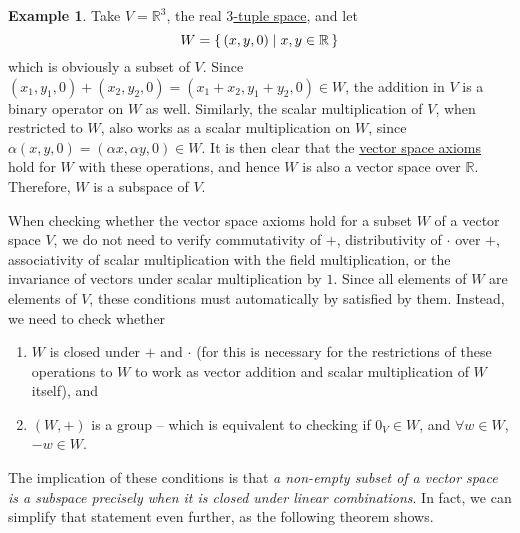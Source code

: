 \documentclass[svgnames]{article}
\theoremstyle{definition}
\newtheorem{Example}[Theorem]{Example}
\theoremstyle{remark}
\begin{document}
\begin{Example}\label{ex:xy<=R3}
Take $V = \mathbb R^3$, the real \hyperref[ex:nTupleSpace]{$3$-tuple space}, and let
\begin{equation*}
	W = \qty{\, (x, y, 0) \mid x, y \in \mathbb R \,}
\end{equation*}
which is obviously a subset of $V$. Since $(x_1, y_1, 0) + (x_2, y_2, 0) = (x_1 + x_2, y_1 + y_2, 0) \in W$, the addition in $V$ is a binary operator on $W$ as well. Similarly, the scalar multiplication of $V$, when restricted to $W$, also works as a scalar multiplication on $W$, since $\alpha(x, y, 0) = (\alpha x, \alpha y, 0) \in W$. It is then clear that the \hyperref[def:VecSpace]{vector space axioms} hold for $W$ with these operations, and hence $W$ is also a vector space over $\mathbb R$. Therefore, $W$ is a subspace of $V$.
\end{Example}

When checking whether the vector space axioms hold for a subset $W$ of a vector space $V$, we do not need to verify commutativity of $+$, distributivity of $\cdot$ over $+$, associativity of scalar multiplication with the field multiplication, or the invariance of vectors under scalar multiplication by $1$. Since all elements of $W$ are elements of $V$, these conditions must automatically by satisfied by them. Instead, we need to check whether
\begin{enumerate}
\item $W$ is closed under $+$ and $\cdot$ (for this is necessary for the restrictions of these operations to $W$ to work as vector addition and scalar multiplication of $W$ itself), and
\item $(W, +)$ is a group -- which is equivalent to checking if $0_V \in W$, and $\forall w \in W$, $-w \in W$.
\end{enumerate}
The implication of these conditions is that \emph{a non-empty subset of a vector space is a subspace precisely when it is closed under linear combinations}. In fact, we can simplify that statement even further, as the following theorem shows.
\end{document}
